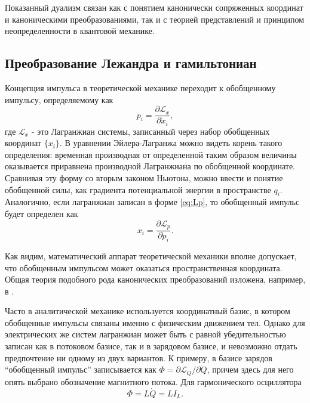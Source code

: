 \documentclass[14pt, a4paper]{extreport}
\numberwithin{equation}{section}
\begin{document}
Показанный дуализм связан как с понятием канонически сопряженных координат и каноническими преобразованиями, так и с теорией представлений и принципом неопределенности в квантовой механике.

\subsection{Преобразование Лежандра и гамильтониан}

Концепция импульса в теоретической механике переходит к обобщенному импульсу, определяемому как 
\begin{equation}
	p_i = \frac{\partial \mathcal{L}_x}{\partial \dot x_i},
\end{equation}
где $ \mathcal{L}_x $ - это Лагранжиан системы, записанный через набор обобщенных координат $\{x_i\}$. В уравнении Эйлера-Лагранжа можно видеть корень такого определения: временная производная от определенной таким образом величины оказывается приравнена производной Лагранжиана по обобщенной координате. Сравнивая эту форму со вторым законом Ньютона, можно ввести и понятие обобщенной силы, как градиента потенциальной энергии в пространстве $q_i$. Аналогично, если лагранжиан записан в форме \eqref{eq:Lp}, то обобщенный импульс будет определен как
\begin{equation}
x_i = \frac{\partial \mathcal{L}_p}{\partial \dot p_i}.
\end{equation}

Как видим, математический аппарат теоретической механики вполне допускает, что обобщенным импульсом может оказаться пространственная координата. Общая теория подобного рода канонических преобразований изложена, например, в \cite{shmutzer1976}.

Часто в аналитической механике используется координатный базис, в котором обобщенные импульсы связаны именно с физическим движением тел. Однако для электрических же систем лагранжиан может быть с равной убедительностью записан как в потоковом базисе, так и в зарядовом базисе, и невозможно отдать предпочтение ни одному из двух вариантов. К примеру, в базисе зарядов ``обобщенный импульс'' записывается как $\Phi = \partial \mathcal{L}_Q / \partial \dot Q$, причем здесь для него опять выбрано обозначение магнитного потока. Для гармонического осциллятора
\begin{equation}
	\Phi = L\dot Q = LI_L. \label{eq:Phi}
\end{equation}
\end{document}
